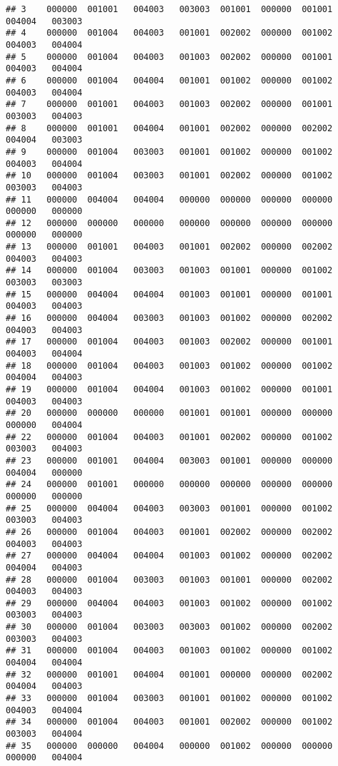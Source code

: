 \documentclass[
]{article}
\begin{document}
\begin{verbatim}
## 3    000000  001001   004003   003003  001001  000000  001001   004004   003003
## 4    000000  001004   004003   001001  002002  000000  001002   004003   004004
## 5    000000  001004   004003   001003  002002  000000  001001   004003   004004
## 6    000000  001004   004004   001001  001002  000000  001002   004003   004004
## 7    000000  001001   004003   001003  002002  000000  001001   003003   004003
## 8    000000  001001   004004   001001  002002  000000  002002   004004   003003
## 9    000000  001004   003003   001001  001002  000000  001002   004003   004004
## 10   000000  001004   003003   001001  002002  000000  001002   003003   004003
## 11   000000  004004   004004   000000  000000  000000  000000   000000   000000
## 12   000000  000000   000000   000000  000000  000000  000000   000000   000000
## 13   000000  001001   004003   001001  002002  000000  002002   004003   004003
## 14   000000  001004   003003   001003  001001  000000  001002   003003   003003
## 15   000000  004004   004004   001003  001001  000000  001001   004003   004003
## 16   000000  004004   003003   001003  001002  000000  002002   004003   004003
## 17   000000  001004   004003   001003  002002  000000  001001   004003   004004
## 18   000000  001004   004003   001003  001002  000000  001002   004004   004003
## 19   000000  001004   004004   001003  001002  000000  001001   004003   004003
## 20   000000  000000   000000   001001  001001  000000  000000   000000   004004
## 22   000000  001004   004003   001001  002002  000000  001002   003003   004003
## 23   000000  001001   004004   003003  001001  000000  000000   004004   000000
## 24   000000  001001   000000   000000  000000  000000  000000   000000   000000
## 25   000000  004004   004003   003003  001001  000000  001002   003003   004003
## 26   000000  001004   004003   001001  002002  000000  002002   004003   004003
## 27   000000  004004   004004   001003  001002  000000  002002   004004   004003
## 28   000000  001004   003003   001003  001001  000000  002002   004003   004003
## 29   000000  004004   004003   001003  001002  000000  001002   003003   004003
## 30   000000  001004   003003   003003  001002  000000  002002   003003   004003
## 31   000000  001004   004003   001003  001002  000000  001002   004004   004004
## 32   000000  001001   004004   001001  000000  000000  002002   004004   004003
## 33   000000  001004   003003   001001  001002  000000  001002   004003   004004
## 34   000000  001004   004003   001001  002002  000000  001002   003003   004004
## 35   000000  000000   004004   000000  001002  000000  000000   000000   004004

\end{verbatim}
\end{document}
